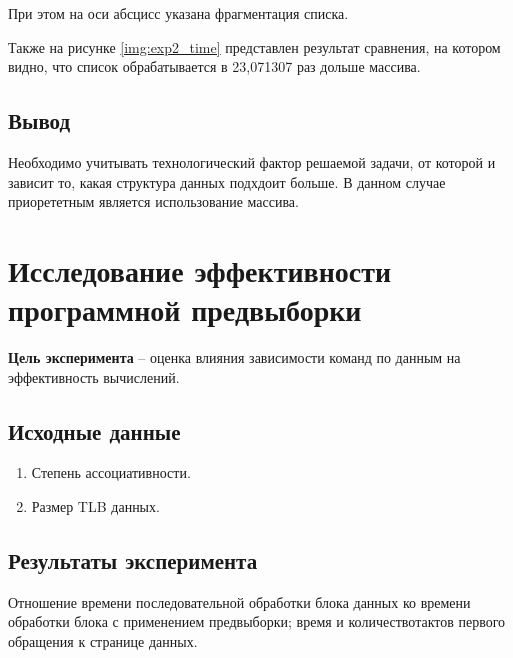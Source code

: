 При этом на оси абсцисс указана фрагментация списка.

%

\clearpage


Также на рисунке \ref{img:exp2_time} представлен результат сравнения, на котором видно, что список обрабатывается в 23,071307 раз дольше массива.



\subsection{Вывод}

Необходимо учитывать технологический фактор решаемой задачи, от которой и зависит то, какая структура данных подхдоит больше. В данном случае приорететным является использование массива. 




\section{Исследование эффективности программной предвыборки}

\textbf{Цель эксперимента} -- оценка   влияния   зависимости   команд   по   данным   на эффективность вычислений.

\subsection{Исходные данные}
\begin{enumerate}
	\item Степень ассоциативности.
	\item Размер TLB данных.
\end{enumerate}

\subsection{Результаты эксперимента}
Отношение времени последовательной обработки блока данных ко времени обработки блока с применением предвыборки; время и количествотактов первого обращения к странице  данных.


